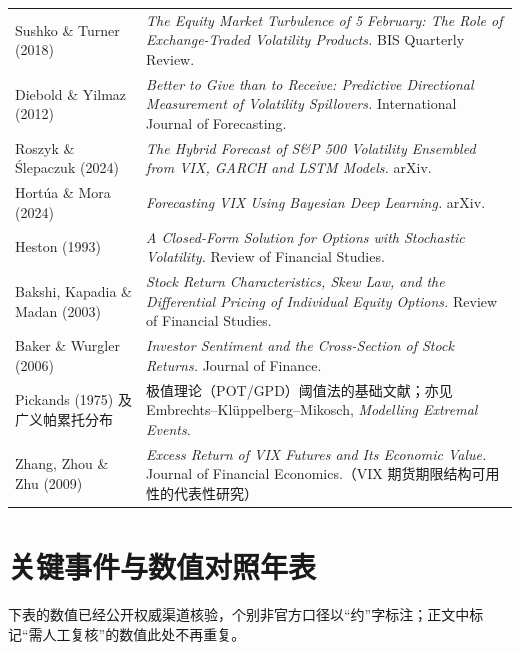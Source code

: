 \documentclass[11pt,a4paper]{ctexart}
\newenvironment{vtable}[1]
  {\begin{longtable}{#1}\toprule}
  {\bottomrule\end{longtable}}
\begin{document}
\begin{vtable}{>{\raggedright\arraybackslash}p{}>{\raggedright\arraybackslash}p{0.62\textwidth}}
Sushko \& Turner (2018) & \textit{The Equity Market Turbulence of 5 February: The Role of Exchange-Traded Volatility Products.} BIS Quarterly Review.\\
Diebold \& Yilmaz (2012) & \textit{Better to Give than to Receive: Predictive Directional Measurement of Volatility Spillovers.} International Journal of Forecasting.\\
Roszyk \& Ślepaczuk (2024) & \textit{The Hybrid Forecast of S\&P 500 Volatility Ensembled from VIX, GARCH and LSTM Models.} arXiv.\\
Hortúa \& Mora (2024) & \textit{Forecasting VIX Using Bayesian Deep Learning.} arXiv.\\
Heston (1993) & \textit{A Closed-Form Solution for Options with Stochastic Volatility.} Review of Financial Studies.\\
Bakshi, Kapadia \& Madan (2003) & \textit{Stock Return Characteristics, Skew Law, and the Differential Pricing of Individual Equity Options.} Review of Financial Studies.\\
Baker \& Wurgler (2006) & \textit{Investor Sentiment and the Cross-Section of Stock Returns.} Journal of Finance.\\
Pickands (1975) 及广义帕累托分布 & 极值理论（POT/GPD）阈值法的基础文献；亦见 Embrechts--Klüppelberg--Mikosch, \textit{Modelling Extremal Events}.\\
Zhang, Zhou \& Zhu (2009) & \textit{Excess Return of VIX Futures and Its Economic Value.} Journal of Financial Economics.（VIX 期货期限结构可用性的代表性研究）\\
\end{vtable}

\section{关键事件与数值对照年表}

下表的数值已经公开权威渠道核验，个别非官方口径以“约”字标注；正文中标记“需人工复核”的数值此处不再重复。
\end{document}
